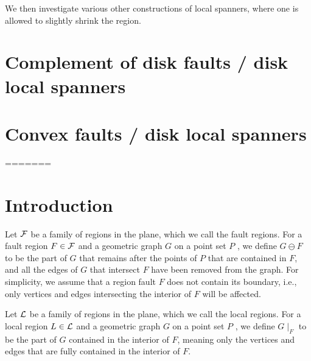 \documentclass[12pt]{article}%
\begin{document}
{We then investigate various other constructions of local spanners,
where one is allowed to slightly shrink the region.
	


\section{Complement of disk faults / disk local spanners}
	
	
\section{Convex faults / disk local spanners}

=======
}%
	
\maketitle
	
\section{Introduction}
	
Let $\mathcal{F}$ be a family of regions in the plane, which we call the fault
regions. For a fault region $F\in \mathcal{F}$ and a geometric graph $G$ on a
point set $P$ , we define $G\ominus F$ to be the part of $G$ that
remains after the points of $P$ that are contained in $F$, and all the
edges of $G$ that intersect $F$ have been removed from the graph. For
simplicity, we assume that a region fault $F$ does not contain its
boundary, i.e., only vertices and edges intersecting the interior of
$F$ will be affected.
	
	
Let $\mathcal{L}$ be a family of regions in the plane, which we call the local
regions. For a local region $L\in \mathcal{L}$ and a geometric graph $G$ on a
point set $P$ , we define $G\mid_F$ to be the part of $G$ contained in
the interior of $F$, meaning only the vertices and edges that are
fully contained in the interior of $F$.
	
\end{document}
